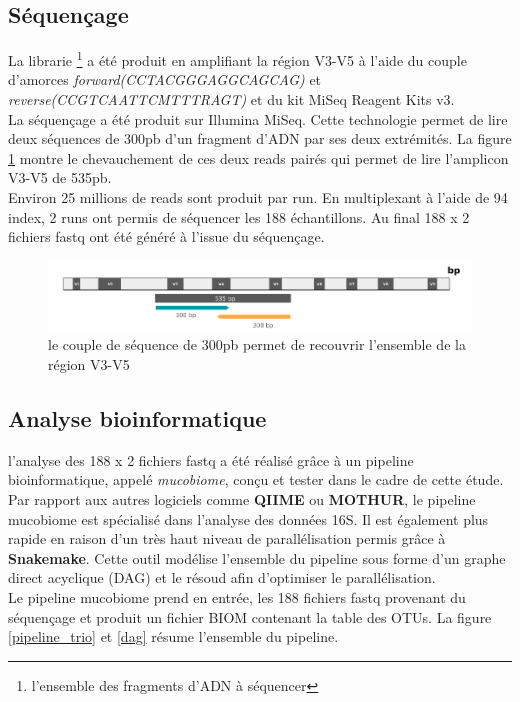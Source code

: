 \documentclass[12pt,a4paper]{article}
\begin{document}
\subsection{Séquençage}
La librarie \footnote{l'ensemble des fragments d'ADN à séquencer} a été produit en amplifiant la région V3-V5 à l’aide du couple d’amorces  \textit{forward(CCTACGGGAGGCAGCAG)} et \textit{reverse(CCGTCAATTCMTTTRAGT)} et du kit MiSeq Reagent Kits v3. \\
La séquençage a été produit sur Illumina MiSeq. Cette technologie permet de lire deux séquences de 300pb d'un fragment d'ADN par ses deux extrémités. La figure \ref{illumina} montre le chevauchement de ces deux reads pairés qui permet de lire l'amplicon V3-V5 de 535pb. \\
Environ 25 millions de reads sont produit par run. En multiplexant à l’aide de 94 index, 2 runs ont permis de séquencer les 188 échantillons.
Au final 188 x 2 fichiers fastq ont été généré à l’issue du séquençage.

\begin{figure}[ht]
\begin{center}
\includegraphics[scale=0.6]{img/illumina.png}\hfill
\end{center}
\caption{le couple de séquence de 300pb permet de recouvrir l'ensemble de la région V3-V5}
\label{illumina}
\end{figure}


\subsection{Analyse bioinformatique}

l’analyse des 188 x 2 fichiers fastq a été réalisé grâce à un pipeline bioinformatique, appelé \textit{mucobiome}, conçu et tester dans le cadre de cette étude. Par rapport aux autres logiciels comme \textbf{QIIME} ou \textbf{MOTHUR}, le pipeline mucobiome est spécialisé dans l’analyse des données 16S. Il est également plus rapide en raison d’un très haut niveau de parallélisation permis grâce à  \textbf{Snakemake}. Cette outil modélise l'ensemble du pipeline sous forme d'un graphe direct acyclique (DAG) et le résoud afin d'optimiser le parallélisation. \\
Le pipeline mucobiome prend en entrée, les 188 fichiers fastq provenant du séquençage et produit un fichier BIOM contenant la table des OTUs. La figure \ref{pipeline_trio} et \ref{dag} résume l'ensemble du pipeline.
\end{document}
